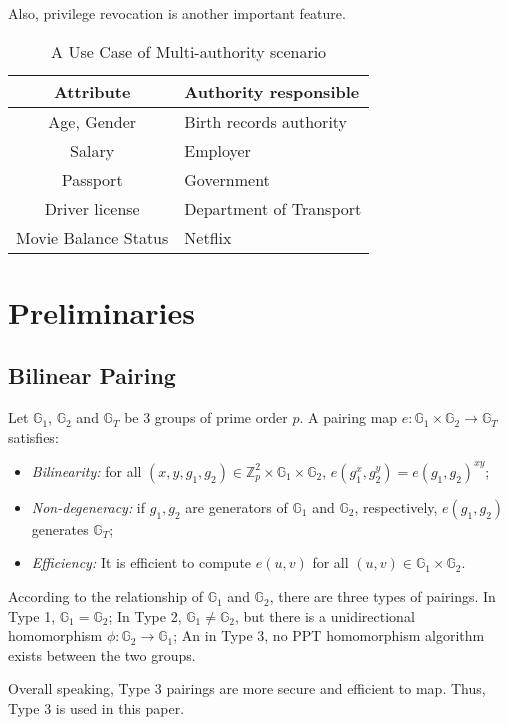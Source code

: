 \documentclass[journal]{IEEEtran}
\begin{document}
Also, privilege revocation is another important feature.

\begin{table}[t]
	\caption{A Use Case of Multi-authority scenario}\label{table:usecase}
	\centering
	\begin{tabular}{c|l}
		\hline
		Attribute & Authority responsible\\
		\hline
		Age, Gender & Birth records authority\\
		Salary & Employer\\
		Passport & Government\\
		Driver license & Department of Transport\\
		Movie Balance Status & Netflix\\
		\hline
	\end{tabular}
\end{table}

\section{Preliminaries}
\subsection{Bilinear Pairing}
Let $\mathbb{G}_1$, $\mathbb{G}_2$ and $\mathbb{G}_T$ be 3 groups of prime order $p$. A pairing map $e:\mathbb{G}_1\times \mathbb{G}_2\rightarrow\mathbb{G}_T$ satisfies:
\begin{itemize}
	\item \textit{Bilinearity:} for all $(x,y, g_1, g_2) \in \mathbb{Z}_p^2\times \mathbb{G}_1\times \mathbb{G}_2$, $e(g_1^x, g_2^y) = e(g_1, g_2)^{xy}$;
	\item \textit{Non-degeneracy:} if $g_1, g_2$ are generators of $\mathbb{G}_1$ and $\mathbb{G}_2$, respectively, $e(g_1, g_2)$ generates $\mathbb{G}_T$;
	\item \textit{Efficiency:} It is efficient to compute $e(u,v)$ for all $(u, v) \in \mathbb{G}_1\times \mathbb{G}_2$.
\end{itemize}

According to the relationship of $\mathbb{G}_1$ and $\mathbb{G}_2$, there are three types of pairings. 
In Type 1, $\mathbb{G}_1 = \mathbb{G}_2$; In Type 2, $\mathbb{G}_1 \neq \mathbb{G}_2$, but there is a unidirectional homomorphism $\phi:\mathbb{G}_2 \rightarrow \mathbb{G}_1$; An in Type 3, no PPT homomorphism algorithm exists between the two groups.

Overall speaking, Type 3 pairings are more secure and efficient to map. Thus, Type 3 is used in this paper.
\end{document}
